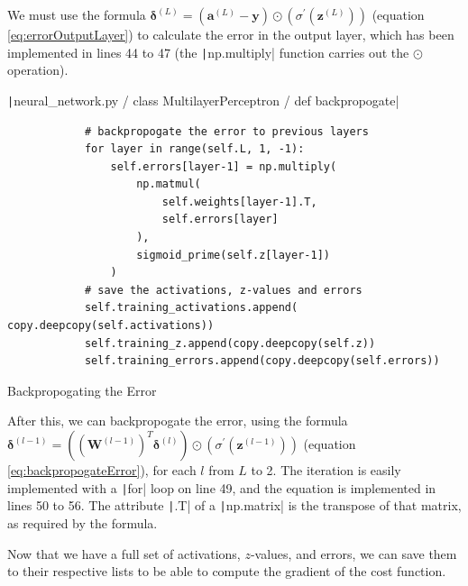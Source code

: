\documentclass[12pt]{report}
\newcommand{\pil}[1]{\protect\texttt|#1|}
\begin{document}
We must use the formula $\bm{\delta}^{\left(L\right)}=\left(\mathbf{a}^{\left(L\right)}-\mathbf{y}\right)\odot \left({\sigma}^{\prime} \left(\mathbf{z}^{\left(L\right)}\right)\right)$ (equation \ref{eq:errorOutputLayer}) to calculate the error in the output layer, which has been implemented in lines 44 to 47 (the \pil{np.multiply} function carries out the $\odot$ operation). 

\begin{listing}[H]
\pil{neural_network.py / class MultilayerPerceptron / def backpropogate}
\begin{verbatim}
            # backpropogate the error to previous layers
            for layer in range(self.L, 1, -1):
                self.errors[layer-1] = np.multiply(
                    np.matmul(
                        self.weights[layer-1].T,
                        self.errors[layer]
                    ),
                    sigmoid_prime(self.z[layer-1])
                )
            # save the activations, z-values and errors
            self.training_activations.append( copy.deepcopy(self.activations))
            self.training_z.append(copy.deepcopy(self.z))
            self.training_errors.append(copy.deepcopy(self.errors))
\end{verbatim}
\caption{Backpropogating the Error}\label{cs:backpropogationBackpropogation}
\end{listing}

After this, we can backpropogate the error, using the formula $\bm{\delta}^{\left(l-1\right)}=\left({\left(\mathbf{W}^{\left(l-1\right)}\right)}^{T}\bm{\delta}^{\left(l\right)}\right)\odot\left({\sigma}^{\prime} \left(\mathbf{z}^{\left(l-1\right)}\right)\right)$ (equation \ref{eq:backpropogateError}), for each $l$ from $L$ to 2. The iteration is easily implemented with a \pil{for} loop on line 49, and the equation is implemented in lines 50 to 56. The attribute \pil{.T} of a \pil{np.matrix} is the transpose of that matrix, as required by the formula.

Now that we have a full set of activations, $z$-values, and errors, we can save them to their respective lists to be able to compute the gradient of the cost function.
\end{document}
